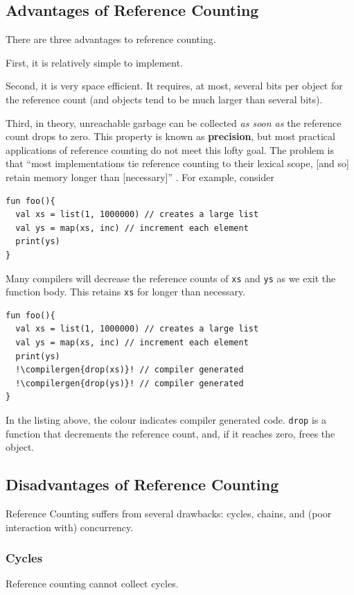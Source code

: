 \subsection{Advantages of Reference Counting}
There are three advantages to reference counting. 

First, it is relatively simple to implement. 

Second, it is very space efficient. It requires, at most, several bits per object for the reference count (and objects tend to be much larger than several bits).

Third, in theory, unreachable garbage can be collected \textit{as soon as} the reference count drops to zero. This property is known as \textbf{precision}, but most practical applications of reference counting do not meet this lofty goal. The problem is that ``most implementations tie reference counting to their lexical scope, [and so] retain memory longer than [necessary]'' \cite{reinking-2021}. For example, consider 

\begin{verbatim}
fun foo(){
  val xs = list(1, 1000000) // creates a large list
  val ys = map(xs, inc) // increment each element
  print(ys)
}
\end{verbatim}
Many compilers will decrease the reference counts of \texttt{xs} and \texttt{ys} as we exit the function body. This retains \texttt{xs} for longer than necessary. 
\begin{verbatim}
fun foo(){
  val xs = list(1, 1000000) // creates a large list
  val ys = map(xs, inc) // increment each element
  print(ys)
  !\compilergen{drop(xs)}! // compiler generated
  !\compilergen{drop(ys)}! // compiler generated
}
\end{verbatim}
In the listing above, the  colour indicates compiler generated code. \texttt{drop} is a function that decrements the reference count, and, if it reaches zero, frees the object.

\subsection{Disadvantages of Reference Counting}
Reference Counting suffers from several drawbacks: cycles, chains, and (poor interaction with) concurrency.

\subsubsection{Cycles}
Reference counting cannot collect cycles.

